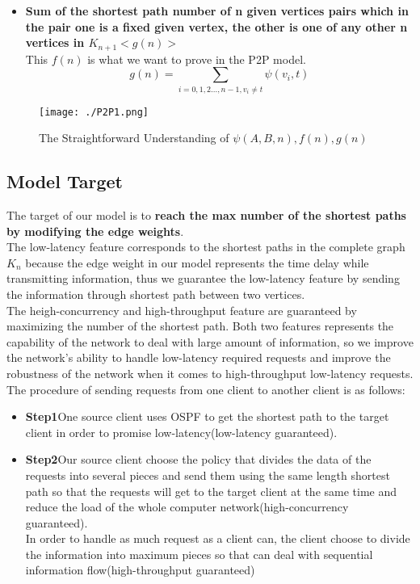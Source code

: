 \documentclass{elegantpaper}
\begin{document}
\begin{itemize}[noitemsep]\item\textbf{Sum of the shortest path number of n given vertices pairs which in the pair one is a fixed given vertex, the other is one of any other n vertices in $K_{n+1}$\quad $<g(n)>$}\\
This $f(n)$ is what we want to prove in the P2P model.
$$g(n) = \sum_{i = 0,1,2...,n-1, v_i \neq t}\psi(v_i,t)$$
 \end{itemize}
 \begin{figure}[htbp]
	
	\centering
	
	\texttt{[image: ./P2P1.png]}
	
	\caption{The Straightforward Understanding of $\psi(A,B,n),f(n),g(n)$}
	
\end{figure} 
 
 \subsection{Model Target}

 The target of our model is to \textbf{reach the max number of the shortest paths by modifying the edge weights}.\\
 The low-latency feature corresponds to the shortest paths in the complete graph $K_n$ because the edge weight in our model represents the time delay while transmitting information, thus we guarantee the low-latency feature by sending the information through shortest path between two vertices. \\
 The heigh-concurrency and high-throughput feature are guaranteed by maximizing the number of the shortest path. Both two features represents the capability of the network to deal with large amount of information, so we improve the network's ability to handle low-latency required requests and improve the robustness of the network when it comes to high-throughput low-latency requests.
 The procedure of sending requests from one client to another client is as follows:
 \begin{itemize}[noitemsep]\item\textbf{Step1\quad }One source client uses OSPF to get the shortest path to the target client in order to promise low-latency(low-latency guaranteed).
 \end{itemize}
 \begin{itemize}[noitemsep]\item\textbf{Step2\quad }Our source  client choose the policy that divides the data of the requests into several pieces and send them using the same length shortest path so that the requests will get to the target client at the same time and reduce the load of the whole computer network(high-concurrency guaranteed). \\
 In order to handle as much request as a client can, the client choose to divide the information into maximum pieces so that can deal with sequential information flow(high-throughput guaranteed)
 \end{itemize}
 
\end{document}
